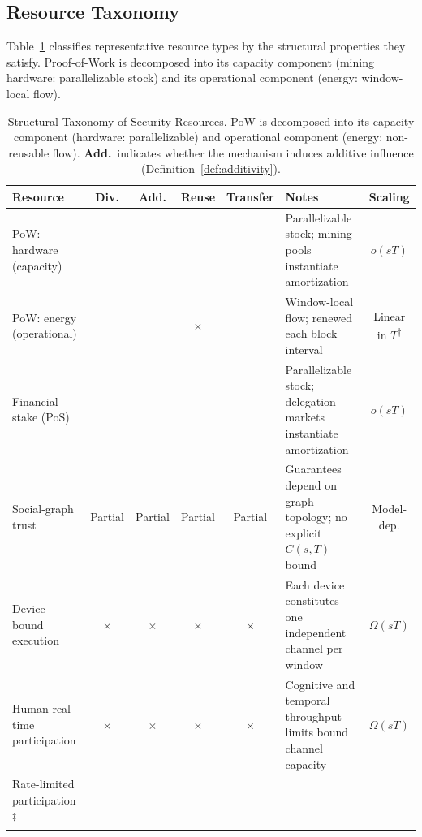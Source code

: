 \documentclass[manuscript,review]{acmart}
\theoremstyle{remark}
\begin{document}
	\subsection{Resource Taxonomy}
	\label{ssec:taxonomy}
	
	Table~\ref{tab:taxonomy} classifies representative
	resource types by the structural properties they satisfy.
	Proof-of-Work is decomposed into its capacity component
	(mining hardware: parallelizable stock) and its
	operational component (energy: window-local flow).
	
	\begin{table}[htbp]
		\caption{Structural Taxonomy of Security Resources.
			PoW is decomposed into its capacity component
			(hardware: parallelizable) and operational component
			(energy: non-reusable flow).
			\textbf{Add.}\ indicates whether the mechanism
			induces additive influence
			(Definition~\ref{def:additivity}).}
		\label{tab:taxonomy}
		\renewcommand{\arraystretch}{1.35}
		\begin{tabularx}{\linewidth}{@{}p{2.4cm}ccccp{2.8cm}c@{}}
			\toprule
			\textbf{Resource} & \textbf{Div.} & \textbf{Add.}
			& \textbf{Reuse} & \textbf{Transfer}
			& \textbf{Notes} & \textbf{Scaling} \\
			\midrule
			PoW: hardware (capacity)
			& \checkmark & \checkmark & \checkmark & \checkmark
			& Parallelizable stock; mining pools instantiate
			amortization
			& $o(sT)$ \\[3pt]
			PoW: energy (operational)
			& \checkmark & \checkmark & $\times$ & \checkmark
			& Window-local flow; renewed each block interval
			& Linear in $T$\textsuperscript{†} \\[3pt]
			Financial stake (PoS)
			& \checkmark & \checkmark & \checkmark & \checkmark
			& Parallelizable stock; delegation markets
			instantiate amortization
			& $o(sT)$ \\[3pt]
			Social-graph trust
			& Partial & Partial & Partial & Partial
			& Guarantees depend on graph topology;
			no explicit $C(s,T)$ bound
			& Model-dep. \\[3pt]
			Device-bound execution
			& $\times$ & $\times$ & $\times$ & $\times$
			& Each device constitutes one independent channel
			per window
			& $\Omega(sT)$ \\[3pt]
			Human real-time participation
			& $\times$ & $\times$ & $\times$ & $\times$
			& Cognitive and temporal throughput limits bound
			channel capacity
			& $\Omega(sT)$ \\[3pt]
			Rate-limited participation\textsuperscript{$\ddagger$}

\end{tabularx}
\end{table}
\end{document}
